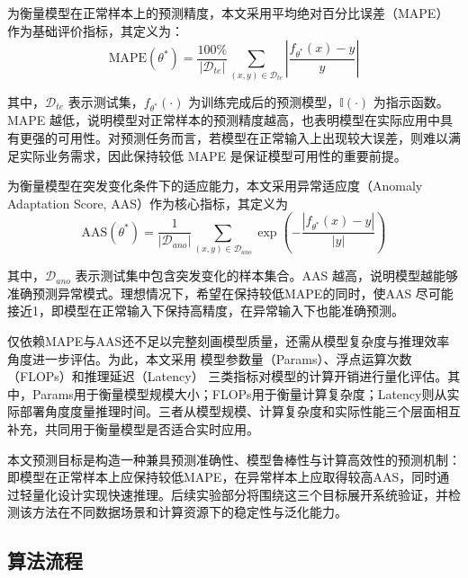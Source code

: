 为衡量模型在正常样本上的预测精度，本文采用平均绝对百分比误差（MAPE）作为基础评价指标，其定义为：
\begin{equation}
\text{MAPE}(\theta^{\ast}) = \frac{100\%}{|\mathcal{D}_{te}|}\sum_{(x,y) \in \mathcal{D}_{te}} \left|\frac{f_{\theta^{\ast}}(x) - y}{y}\right|
\tag{3-21}
\end{equation}

其中，\(\mathcal{D}_{te}\) 表示测试集，\(f_{\theta^{\ast}}(\cdot)\) 为训练完成后的预测模型，\(\mathbb{I}(\cdot)\) 为指示函数。MAPE
越低，说明模型对正常样本的预测精度越高，也表明模型在实际应用中具有更强的可用性。对预测任务而言，若模型在正常输入上出现较大误差，则难以满足实际业务需求，因此保持较低
MAPE 是保证模型可用性的重要前提。

为衡量模型在突发变化条件下的适应能力，本文采用异常适应度（Anomaly Adaptation Score, AAS）作为核心指标，其定义为
\begin{equation}
\text{AAS}(\theta^{\ast}) = \frac{1}{|\mathcal{D}_{ano}|}\sum_{(x,y) \in \mathcal{D}_{ano}} \exp\left(-\frac{|f_{\theta^{\ast}}(x) - y|}{|y|}\right)
\tag{3-22}
\end{equation}

其中，\(\mathcal{D}_{ano}\) 表示测试集中包含突发变化的样本集合。AAS
越高，说明模型越能够准确预测异常模式。理想情况下，希望在保持较低MAPE的同时，使AAS
尽可能接近1，即模型在正常输入下保持高精度，在异常输入下也能准确预测。

仅依赖MAPE与AAS还不足以完整刻画模型质量，还需从模型复杂度与推理效率角度进一步评估。为此，本文采用
模型参数量（Params）、浮点运算次数（FLOPs）和推理延迟（Latency）
三类指标对模型的计算开销进行量化评估。其中，Params用于衡量模型规模大小；FLOPs用于衡量计算复杂度；Latency则从实际部署角度度量推理时间。三者从模型规模、计算复杂度和实际性能三个层面相互补充，共同用于衡量模型是否适合实时应用。

本文预测目标是构造一种兼具预测准确性、模型鲁棒性与计算高效性的预测机制：即模型在正常样本上应保持较低MAPE，在异常样本上应取得较高AAS，同时通过轻量化设计实现快速推理。后续实验部分将围绕这三个目标展开系统验证，并检测该方法在不同数据场景和计算资源下的稳定性与泛化能力。

\subsection{算法流程}\label{ux7b97ux6cd5ux6d41ux7a0b}

